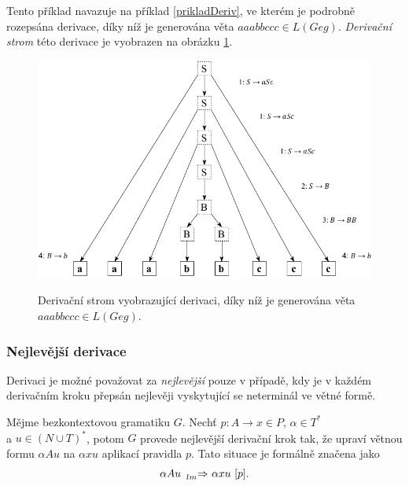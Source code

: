 \begin{priklad} \label{prikladDerivStromu}
  Tento příklad navazuje na příklad \ref{prikladDeriv}, ve kterém je podrobně rozepsána derivace, díky níž je generována věta $aaabbccc \in L(G{eg})$.
  \emph{Derivační strom} této derivace je vyobrazen na obrázku \ref{obrDerivacniStrom}.

  \begin{figure}[h]\centering
    \centering
    \includegraphics[scale=1.1]{obrazky/DerivativeTreeExample.pdf}\\[1pt]

    \caption{Derivační strom vyobrazující derivaci, díky níž je generována věta \linebreak $aaabbccc \in L(G{eg})$.}
    \label{obrDerivacniStrom}
  \end{figure}
\end{priklad}

\subsubsection{Nejlevější derivace}
Derivaci je možné považovat za \emph{nejlevější} pouze v případě, kdy je v každém derivačním kroku přepsán nejlevěji vyskytující se neterminál ve větné formě.
\begin{definice}
  Mějme bezkontextovou gramatiku $G$. Nechť $p\!: A \rightarrow x \in P$, $\alpha \in T^*$ \\ a $u \in (N \cup T)^*$, potom $G$ provede nejlevější derivační krok
  tak, že upraví větnou formu $\alpha Au$ na $\alpha xu$ aplikací pravidla $p$. Tato situace je formálně značena jako
  $$\alpha Au\ \prescript{}{lm}{\Rightarrow}\ \alpha xu\ [p].$$
\end{definice}

